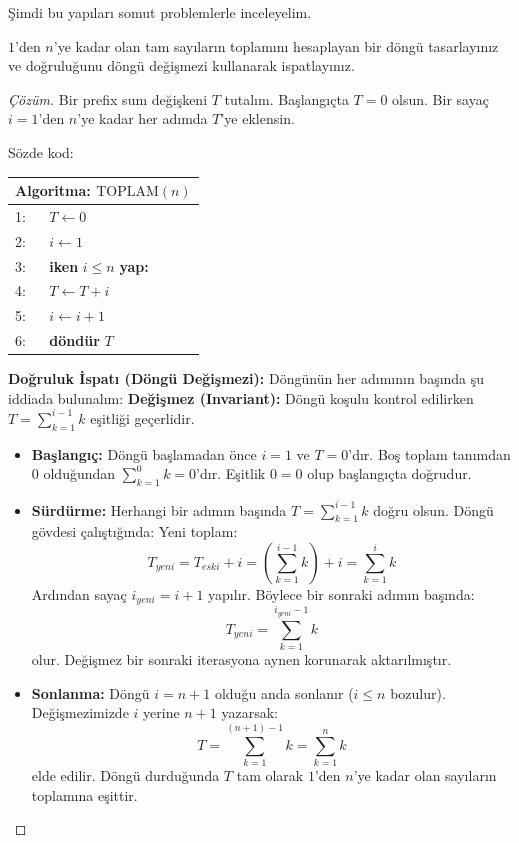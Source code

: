 Şimdi bu yapıları somut problemlerle inceleyelim.

\begin{example}
$1$'den $n$'ye kadar olan tam sayıların toplamını hesaplayan bir döngü tasarlayınız ve doğruluğunu döngü değişmezi kullanarak ispatlayınız.
\end{example}

\begin{proof}[Çözüm]
Bir prefix sum değişkeni $T$ tutalım. Başlangıçta $T = 0$ olsun. Bir sayaç $i = 1$'den $n$'ye kadar her adımda $T$'ye eklensin.

Sözde kod:
\begin{center}
\begin{minipage}{1.0\textwidth}
\begin{tabular}{p{2.4cm}p{9.4cm}}
\hline
\multicolumn{2}{l}{\textbf{Algoritma:} $\text{TOPLAM}(n)$} \\
\hline
1: & $T \leftarrow 0$ \\
2: & $i \leftarrow 1$ \\
3: & \textbf{iken} $i \le n$ \textbf{yap:} \\
4: & \quad $T \leftarrow T + i$ \\
5: & \quad $i \leftarrow i + 1$ \\
6: & \textbf{döndür} $T$ \\
\hline
\end{tabular}
\end{minipage}
\end{center}

\textbf{Doğruluk İspatı (Döngü Değişmezi):}
Döngünün her adımının başında şu iddiada bulunalım:
\textbf{Değişmez (Invariant):} Döngü koşulu kontrol edilirken $T = \sum_{k=1}^{i-1} k$ eşitliği geçerlidir.
\begin{itemize}
    \item \textbf{Başlangıç:} Döngü başlamadan önce $i = 1$ ve $T = 0$'dır. Boş toplam tanımdan $0$ olduğundan $\sum_{k=1}^{0} k = 0$'dır. Eşitlik $0 = 0$ olup başlangıçta doğrudur.
    \item \textbf{Sürdürme:} Herhangi bir adımın başında $T = \sum_{k=1}^{i-1} k$ doğru olsun. Döngü gövdesi çalıştığında:
    Yeni toplam:
    \[ T_{yeni} = T_{eski} + i = \left(\sum_{k=1}^{i-1} k\right) + i = \sum_{k=1}^{i} k \]
    Ardından sayaç $i_{yeni} = i + 1$ yapılır. Böylece bir sonraki adımın başında:
    \[ T_{yeni} = \sum_{k=1}^{i_{yeni}-1} k \]
    olur. Değişmez bir sonraki iterasyona aynen korunarak aktarılmıştır.
    \item \textbf{Sonlanma:} Döngü $i = n + 1$ olduğu anda sonlanır ($i \le n$ bozulur). Değişmezimizde $i$ yerine $n + 1$ yazarsak:
    \[ T = \sum_{k=1}^{(n+1)-1} k = \sum_{k=1}^{n} k \]
    elde edilir. Döngü durduğunda $T$ tam olarak $1$'den $n$'ye kadar olan sayıların toplamına eşittir.
\end{itemize}
\end{proof}

